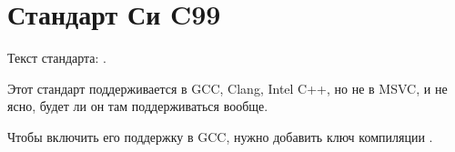 ﻿\label{C99}
\chapter{Стандарт Си C99}

Текст стандарта: \cite{C99TC3}.

Этот стандарт поддерживается в GCC, Clang, Intel C++, но не в MSVC, и не ясно, будет ли он там поддерживаться вообще.

Чтобы включить его поддержку в GCC, нужно добавить ключ компиляции .
